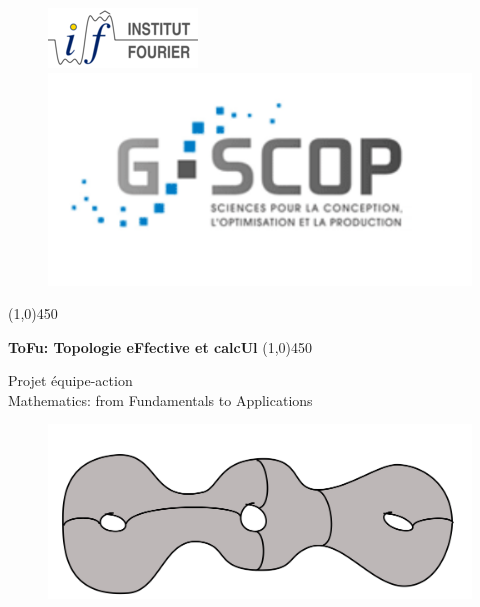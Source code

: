\documentclass[14pt,fleqn]{article}
\begin{document}
 \begin{figure}[H]
  \centering
  \subfloat  
{\includegraphics[scale=1]{iflogo-azur-sable-150x60_0.png}  
}
 \hfill
  \subfloat
  {\includegraphics[scale=.4]{gscop.png}  
}

\end{figure}


\begin{center}
\line(1,0){450}

\vspace{0.2in}
{\huge \bf ToFu: Topologie eFfective et calcUl}
\vspace{0.2in}
\line(1,0){450}
\bigskip

{\Large Projet équipe-action  \\
Mathematics: from Fundamentals to Applications}
\\

\end{center}


\begin{figure}[H]
\begin{center}
\includegraphics[scale=.25]{IMG_5383.jpg}
\end{center} 
\end{figure}
\end{document}

